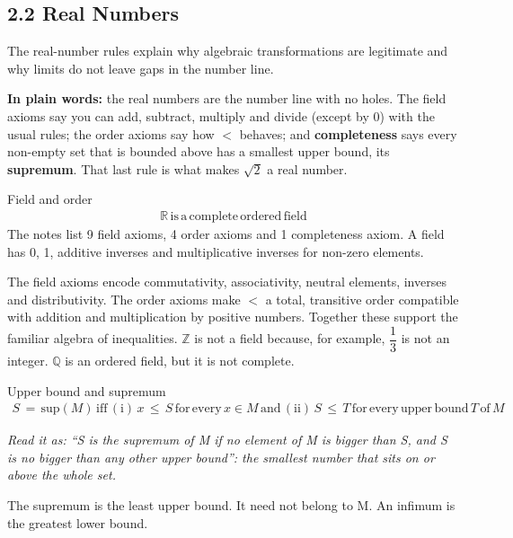 \documentclass[11pt]{article}
\begin{document}
\begin{keepsection}
\section{2.2 Real Numbers}

The real-number rules explain why algebraic transformations are legitimate and why limits do not leave gaps in the number line.

\begin{plainbox}\textbf{In plain words:} the real numbers are the number line with no holes. The field axioms say you can add, subtract, multiply and divide (except by 0) with the usual rules; the order axioms say how \ensuremath{<} behaves; and \textbf{completeness} says every non-empty set that is bounded above has a smallest upper bound, its \textbf{supremum}. That last rule is what makes \ensuremath{\sqrt{2}} a real number.\end{plainbox}

\begin{equationcard}{Field and order}
\[ \begin{gathered} \mathbb{R}\, \text{is}\, \mathrm{a}\, \text{complete}\, \text{ordered}\, \text{field} \end{gathered} \]
{\small The notes list 9 field axioms, 4 order axioms and 1 completeness axiom. A field has 0, 1, additive inverses and multiplicative inverses for non-zero elements.}
\end{equationcard}

The field axioms encode commutativity, associativity, neutral elements, inverses and distributivity. The order axioms make \ensuremath{<} a total, transitive order compatible with addition and multiplication by positive numbers. Together these support the familiar algebra of inequalities. \ensuremath{\mathbb{Z}} is not a field because, for example, {\small\ensuremath{\dfrac{1}{3}}} is not an integer. \ensuremath{\mathbb{Q}} is an ordered field, but it is not complete.

\begin{equationcard}{Upper bound and supremum}
\[ \begin{gathered} {S}\, =\, \text{sup}({M})\, \text{iff}\, (\mathrm{i})\, {x}\, \leq \, {S}\, \text{for}\, \text{every}\, {x}\in {M}\, \text{and}\, (\text{ii})\, {S}\, \leq \, {T}\, \text{for}\, \text{every}\, \text{upper}\, \text{bound}\, {T}\, \text{of}\, {M} \end{gathered} \]
{\small \emph{Read it as: “S is the supremum of M if no element of M is bigger than S, and S is no bigger than any other upper bound”: the smallest number that sits on or above the whole set.}\par The supremum is the least upper bound. It need not belong to M. An infimum is the greatest lower bound.}
\end{equationcard}


\end{keepsection}
\end{document}

